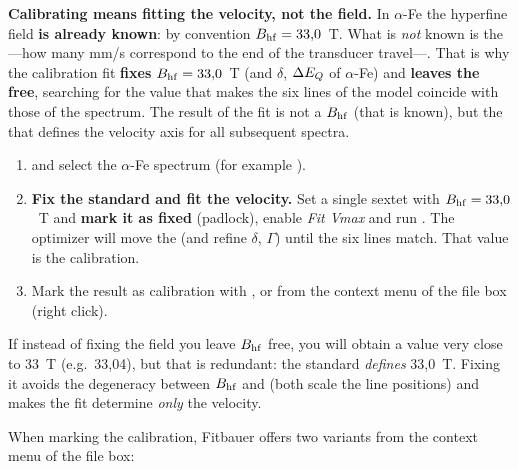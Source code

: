 \begin{aviso}
\textbf{Calibrating means fitting the velocity, not the field.} In $\alpha$-Fe
the hyperfine field \textbf{is already known}: by convention $B_{\mathrm{hf}} = 33{,}0$~T.
What is \emph{not} known is the  —how many mm/s correspond to the end
of the transducer travel—. That is why the calibration fit \textbf{fixes}
$B_{\mathrm{hf}} = 33{,}0$~T (and $\delta$, $\Delta E_{Q}$ of $\alpha$-Fe) and \textbf{leaves the
 free}, searching for the value that makes the six lines of the model
coincide with those of the spectrum. The result of the fit is not a $B_{\mathrm{hf}}$ (that
is known), but the  that defines the velocity axis for all subsequent
spectra.
\end{aviso}

\begin{enumerate}[nosep]
  \item {} and select the $\alpha$-Fe spectrum
        (for example ).
  \item \textbf{Fix the standard and fit the velocity.} Set a single sextet with
        $B_{\mathrm{hf}} = 33{,}0$~T and \textbf{mark it as fixed} (padlock), enable
        \emph{Fit Vmax} and run . The optimizer
        will move the  (and refine $\delta$, $\Gamma$) until the six
        lines match. That  value is the calibration.
  \item Mark the result as calibration with
        , or from the context
        menu of the file box (right click).
\end{enumerate}

\begin{nota}
If instead of fixing the field you leave $B_{\mathrm{hf}}$ free, you will obtain a value
very close to 33~T (e.g.\ 33{,}04), but that is redundant: the standard
\emph{defines} 33{,}0~T. Fixing it avoids the degeneracy between $B_{\mathrm{hf}}$ and
 (both scale the line positions) and makes the fit determine
\emph{only} the velocity.
\end{nota}


When marking the calibration, Fitbauer offers two variants from the context menu
of the file box:

